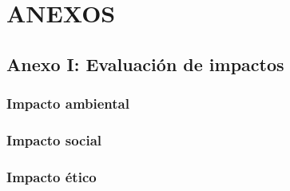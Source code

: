\documentclass[a4paper, 12pt, spanish, twoside]{article}
\begin{document}
\newpage

\section*{ANEXOS} \label{sec:anexos} %

\renewcommand{\thesubsection}{\Alph{subsection}} %
\renewcommand{\thetable}{\Alph{subsection}.\arabic{table}}
\renewcommand{\thefigure}{\Alph{subsection}.\arabic{figure}}
\renewcommand{\thecode}{\Alph{subsection}.\arabic{code}}


\subsection{Anexo I: Evaluación de impactos} \label{sec:anexo1}
\subsubsection{Impacto ambiental} \label{sec:anexo1:ambiental}
\subsubsection{Impacto social} \label{sec:anexo1:social}
\subsubsection{Impacto ético} \label{sec:anexo1:etico}
\end{document}
